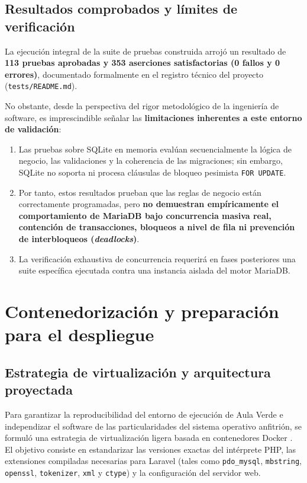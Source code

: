 \subsection{Resultados comprobados y límites de verificación}
\label{sec:resultados_limites_pruebas}

La ejecución integral de la suite de pruebas construida arrojó un resultado de \textbf{113 pruebas aprobadas y 353 aserciones satisfactorias (0 fallos y 0 errores)}, documentado formalmente en el registro técnico del proyecto (\texttt{tests/README.md}).

No obstante, desde la perspectiva del rigor metodológico de la ingeniería de software, es imprescindible señalar las \textbf{limitaciones inherentes a este entorno de validación}:
\begin{enumerate}
    \item Las pruebas sobre SQLite en memoria evalúan secuencialmente la lógica de negocio, las validaciones y la coherencia de las migraciones; sin embargo, SQLite no soporta ni procesa cláusulas de bloqueo pesimista \texttt{FOR UPDATE}.
    \item Por tanto, estos resultados prueban que las reglas de negocio están correctamente programadas, pero \textbf{no demuestran empíricamente el comportamiento de MariaDB bajo concurrencia masiva real, contención de transacciones, bloqueos a nivel de fila ni prevención de interbloqueos (\textit{deadlocks})}.
    \item La verificación exhaustiva de concurrencia requerirá en fases posteriores una suite específica ejecutada contra una instancia aislada del motor MariaDB.
\end{enumerate}

\section{Contenedorización y preparación para el despliegue}
\label{sec:despliegue_docker}

\subsection{Estrategia de virtualización y arquitectura proyectada}
\label{sec:estrategia_docker}

Para garantizar la reproducibilidad del entorno de ejecución de Aula Verde e independizar el software de las particularidades del sistema operativo anfitrión, se formuló una estrategia de virtualización ligera basada en contenedores Docker \cite{docker2024overview}. El objetivo consiste en estandarizar las versiones exactas del intérprete PHP, las extensiones compiladas necesarias para Laravel (tales como \texttt{pdo\_mysql}, \texttt{mbstring}, \texttt{openssl}, \texttt{tokenizer}, \texttt{xml} y \texttt{ctype}) y la configuración del servidor web.

